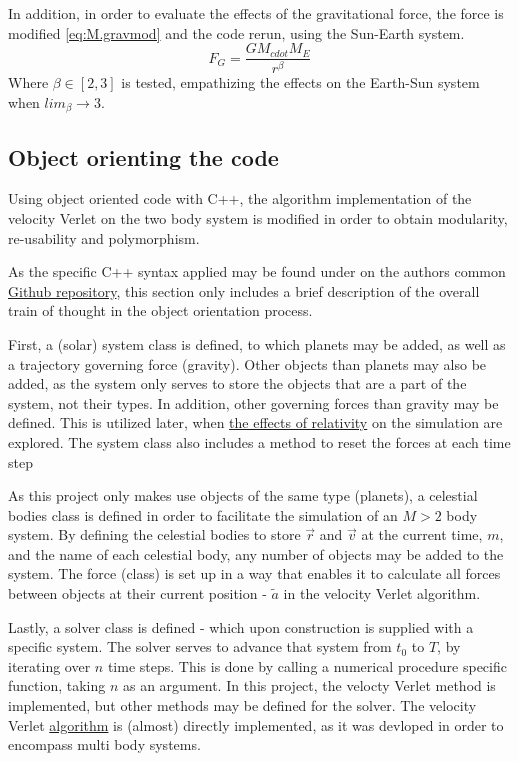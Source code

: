 \documentclass[%
oneside,                 %
final,                   %
10pt]{article}
\begin{document}
In addition, in order to evaluate the effects of the gravitational force, the force is modified \eqref{eq:M.gravmod} and the code rerun, using the Sun-Earth system.
\begin{equation}
F_G=\frac{GM_{cdot}M_{E}}{r^{\beta}}
\label{eq:M.gravmod}
\end{equation}
Where $\beta \in [2,3]$ is tested, empathizing the effects on the Earth-Sun system when $lim_{\beta} \rightarrow 3$.

 
\subsection{Object orienting the code}  
\label{sec:OOing}
Using object oriented code with C++, the algorithm implementation of the velocity Verlet on the two body system is modified in order to obtain modularity, re-usability and polymorphism.  \newline

As the specific C++ syntax applied may be found under on the authors common \href{https://github.com/johanere/CP3}{Github repository}, this section only includes a brief description of the overall train of thought in the object orientation process. \newline

First, a (solar) system class is defined, to which planets may be added, as well as a trajectory governing force (gravity). Other objects than planets may also be added, as the system only serves to store the objects that are a part of the system, not their types. In addition, other governing forces than gravity may be defined. This is utilized later, when \hyperref[sec:M.effectsofrel]{the effects of relativity} on the simulation are explored. The system class also includes a method to reset the forces at each time step\newline

As this project only makes use objects of the same type (planets), a celestial bodies class is defined in order to facilitate the simulation of an $M>2$ body system. By defining the celestial bodies to store $\vec{r}$ and $\vec{v}$ at the current time, $m$, and the name of each celestial body, any number of objects may be added to the system. The force (class) is set up in a way that enables it to calculate all forces between objects at their current position - $\tilde{a}$ in the velocity Verlet algorithm. \newline

Lastly, a solver class is defined - which upon construction is supplied with a specific system. The solver serves to advance that system from $t_{0}$ to $T$, by iterating over $n$ time steps. This is done by calling a numerical procedure specific function, taking $n$ as an argument. In this project, the velocty Verlet method is implemented, but other methods may be defined for the solver. The velocity Verlet \hyperref[subsec:algos]{algorithm} is (almost) directly implemented, as it was devloped in order to encompass multi body systems. \newline
\end{document}
